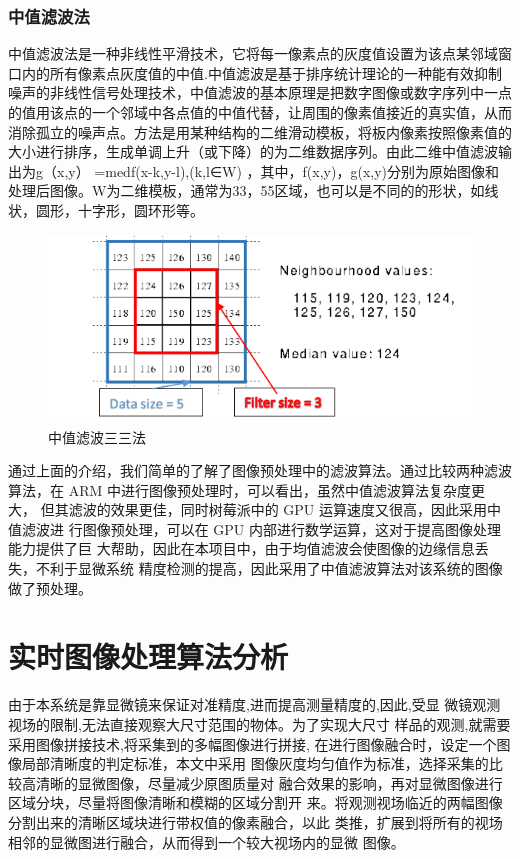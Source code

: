 \subsubsection{中值滤波法}
中值滤波法是一种非线性平滑技术，它将每一像素点的灰度值设置为该点某邻域窗口内的所有像素点灰度值的中值.中值滤波是基于排序统计理论的一种能有效抑制噪声的非线性信号处理技术，中值滤波的基本原理是把数字图像或数字序列中一点的值用该点的一个邻域中各点值的中值代替，让周围的像素值接近的真实值，从而消除孤立的噪声点。方法是用某种结构的二维滑动模板，将板内像素按照像素值的大小进行排序，生成单调上升（或下降）的为二维数据序列。由此二维中值滤波输出为g（x,y） =med{f(x-k,y-l),(k,l∈W)} ，其中，f(x,y)，g(x,y)分别为原始图像和处理后图像。W为二维模板，通常为33，55区域，也可以是不同的的形状，如线状，圆形，十字形，圆环形等。
\begin{figure}[h]
\centering
\includegraphics[width=0.7\linewidth]{Figure/median_2}
\caption{中值滤波三三法}
\label{fig:median_1}
\end{figure}

通过上面的介绍，我们简单的了解了图像预处理中的滤波算法。通过比较两种滤波算法，在 ARM 中进行图像预处理时，可以看出，虽然中值滤波算法复杂度更大， 但其滤波的效果更佳，同时树莓派中的 GPU 运算速度又很高，因此采用中值滤波进 行图像预处理，可以在 GPU 内部进行数学运算，这对于提高图像处理能力提供了巨 大帮助，因此在本项目中，由于均值滤波会使图像的边缘信息丢失，不利于显微系统 精度检测的提高，因此采用了中值滤波算法对该系统的图像做了预处理。




\section{实时图像处理算法分析}
由于本系统是靠显微镜来保证对准精度,进而提高测量精度的,因此,受显
微镜观测视场的限制,无法直接观察大尺寸范围的物体。为了实现大尺寸
样品的观测,就需要采用图像拼接技术,将采集到的多幅图像进行拼接,
在进行图像融合时，设定一个图像局部清晰度的判定标准，本文中采用 图像灰度均匀值作为标准，选择采集的比较高清晰的显微图像，尽量减少原图质量对 融合效果的影响，再对显微图像进行区域分块，尽量将图像清晰和模糊的区域分割开 来。将观测视场临近的两幅图像分割出来的清晰区域块进行带权值的像素融合，以此 类推，扩展到将所有的视场相邻的显微图进行融合，从而得到一个较大视场内的显微 图像。 \cite{fastprocessing}

